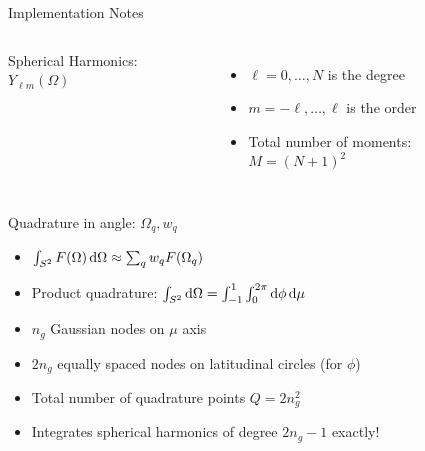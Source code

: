 \documentclass{beamer}
\begin{document}
    \begin{frame}{Implementation Notes}
        \begin{columns}
            Spherical Harmonics: $Y_{\ell m}(\Omega)$
            \begin{itemize}
                \item $\ell = 0, \dots, N$ is the degree
                \item $m = -\ell , \dots, \ell$ is the order
                \item Total number of moments: $M = (N + 1)^2$
            \end{itemize}

        \end{columns}

        \vfill

        Quadrature in angle: $\Omega_q, w_q$
        \begin{itemize}
            \item $\int_{S^2} F(\Omega) \dif \Omega \approx \sum_q w_q F(\Omega_q)$
            \item Product quadrature: $\int_{S^2} \dif \Omega = \int_{-1}^1 \int_0^{2\pi} \dif \phi \dif \mu$
            \item $n_g$ Gaussian nodes on $\mu$ axis
            \item $2n_g$ equally spaced nodes on latitudinal circles (for $\phi$)
            \item Total number of quadrature points $Q = 2n_g^2$
            \item Integrates spherical harmonics of degree $2n_g - 1$ exactly!
        \end{itemize}
    \end{frame}
\end{document}

